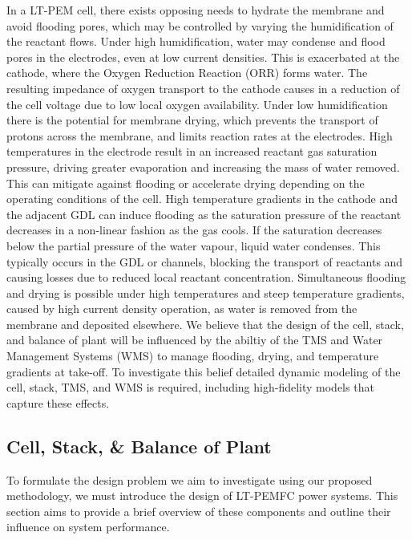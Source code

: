 In a LT-PEM cell, there exists opposing needs to hydrate the membrane and avoid flooding pores, which may be controlled by varying the humidification of the reactant flows. Under high humidification, water may condense and flood pores in the electrodes, even at low current densities.
This is exacerbated at the cathode, where the Oxygen Reduction Reaction (ORR) forms water.
The resulting impedance of oxygen transport to the cathode causes in a reduction of the cell voltage due to low local oxygen availability.
Under low humidification there is the potential for membrane drying, which prevents the transport of protons across the membrane, and limits reaction rates at the electrodes.
High temperatures in the electrode result in an increased reactant gas saturation pressure, driving greater evaporation and increasing the mass of water removed.
This can mitigate against flooding or accelerate drying depending on the operating conditions of the cell.
High temperature gradients in the cathode and the adjacent GDL can induce flooding as the saturation pressure of the reactant decreases in a non-linear fashion as the gas cools.
If the saturation decreases below the partial pressure of the water vapour, liquid water condenses.
This typically occurs in the GDL or channels, blocking the transport of reactants and causing losses due to reduced local reactant concentration.
Simultaneous flooding and drying is possible under high temperatures and steep temperature gradients, caused by high current density operation, as water is removed from the membrane and deposited elsewhere.
We believe that the design of the cell, stack, and balance of plant will be influenced by the abiltiy of the TMS and Water Management Systems (WMS) to manage flooding, drying, and temperature gradients at take-off.
To investigate this belief detailed dynamic modeling of the cell, stack, TMS, and WMS is required, including high-fidelity models that capture these effects.

\subsection{Cell, Stack, \& Balance of Plant} \label{sec:design}
To formulate the design problem we aim to investigate using our proposed methodology, we must introduce the design of LT-PEMFC power systems. This section aims to provide a brief overview of these components and outline their influence on system performance.

